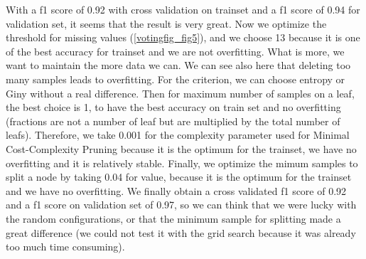 \documentclass[11pt]{article}
\begin{document}
With a f1 score of 0.92 with cross validation on trainset and a f1 score of 0.94 for validation set, it seems that the result is very great.  Now we optimize the threshold for missing values (\ref{votingfig_fig5}), and we choose 13 because it is one of the best accuracy for trainset and we are not overfitting. What is more, we want to maintain the more data we can. We can see also here that deleting too many samples leads to overfitting. For the criterion, we can choose entropy or Giny without a real difference. Then for maximum number of samples on a leaf, the best choice is 1, to have the best accuracy on train set and no overfitting (fractions are not a number of leaf but are multiplied by the total number of leafs). Therefore, we take 0.001 for the complexity parameter used for Minimal Cost-Complexity Pruning because it is the optimum for the trainset, we have no overfitting and it is relatively stable. Finally, we optimize the mimum samples to split a node by taking 0.04 for value, because it is the optimum for the trainset and we have no overfitting.
We finally obtain a cross validated f1 score of 0.92 and a f1 score on validation set of 0.97, so we can think that we were lucky with the random configurations, or that the minimum sample for splitting made a great difference (we could not test it with the grid search because it was already too much time consuming).
\end{document}
